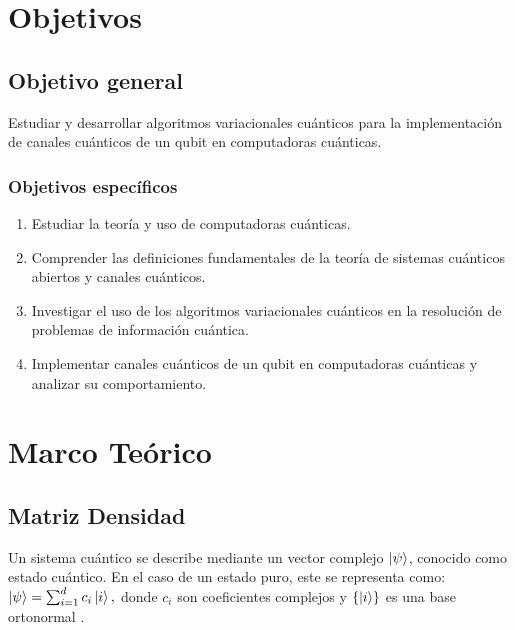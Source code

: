 \documentclass[11pt, spanish, letterpage]{article} %
\newcounter{problem}[section]
\begin{document}
%

\tableofcontents

\bigskip



\section{Objetivos}
\subsection{Objetivo general}

Estudiar y desarrollar algoritmos variacionales cuánticos   para la
implementación de canales cuánticos de un  qubit en computadoras cuánticas.


\subsubsection{Objetivos específicos}


\begin{enumerate}
    \item Estudiar la teoría y uso de computadoras cuánticas.
    \item Comprender las definiciones fundamentales de la teoría de sistemas cuánticos abiertos y canales cuánticos.
    \item Investigar el uso de los algoritmos variacionales cuánticos en la resolución de problemas de información cuántica.
    \item Implementar canales cuánticos de un qubit en computadoras cuánticas y analizar su comportamiento.
\end{enumerate}



\section{Marco Teórico} %

\subsection{Matriz Densidad}

Un sistema cuántico se describe mediante un vector complejo $\ket{\psi}$, conocido como estado cuántico. En el caso de un estado puro, este se representa como: 
$ \ket{\psi} = \sum_{i=1}^{d} c_i \ket{i}, $
donde $c_i$ son coeficientes complejos y $\{\ket{i}\}$ es una base ortonormal \cite{nielsen_chuang_2011}.
\end{document}
